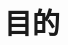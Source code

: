 \documentclass[a4paper, titlepage]{jsarticle}
\title{}
\author{三浦夢生}
\date{年月日}
\begin{document}
	\maketitle

	\section{目的}
	\begin{lstlisting}
	\end{lstlisting}
\end{document}
